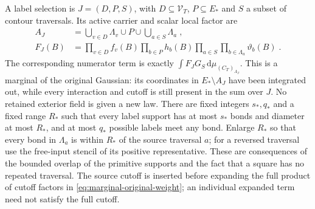 \documentclass[11pt]{article}
\newcommand{\dd}{\mathrm{d}}
\begin{document}
A label selection is $J=(D,P,S)$, with $D\subseteq \mathcal V_T$, $P\subseteq E_*$ and $S$ a subset of contour traversals. Its active carrier and scalar local factor are
\begin{equation}\label{eq:marginal-selection}
    \begin{aligned}
        A_J&=\bigcup_{v\in D}\Lambda_v\cup P
            \cup\bigcup_{a\in S}\Lambda_a\;,\\
        F_J(B)&=\prod_{v\in D}f_v(B)\prod_{b\in P}h_b(B)
            \prod_{a\in S}\prod_{b\in \Lambda_a}\vartheta_b(B)\;.
    \end{aligned}
\end{equation}
The corresponding numerator term is exactly $\int F_JG_S\,\dd\mu_{(C_T)_{A_J}}$. This is a marginal of the original Gaussian: its coordinates in $E_*\setminus A_J$ have been integrated out, while every interaction and cutoff is still present in the sum over $J$. No retained exterior field is given a new law. There are fixed integers $s_*,q_*$ and a fixed range $R_*$ such that every label support has at most $s_*$ bonds and diameter at most $R_*$, and at most $q_*$ possible labels meet any bond. Enlarge $R_*$ so that every bond in $\Lambda_a$ is within $R_*$ of the source traversal $a$; for a reversed traversal use the free-input stencil of its positive representative. These are consequences of the bounded overlap of the primitive supports and the fact that a square has no repeated traversal. The source cutoff is inserted before expanding the full product of cutoff factors in \eqref{eq:marginal-original-weight}; an individual expanded term need not satisfy the full cutoff.
\end{document}
